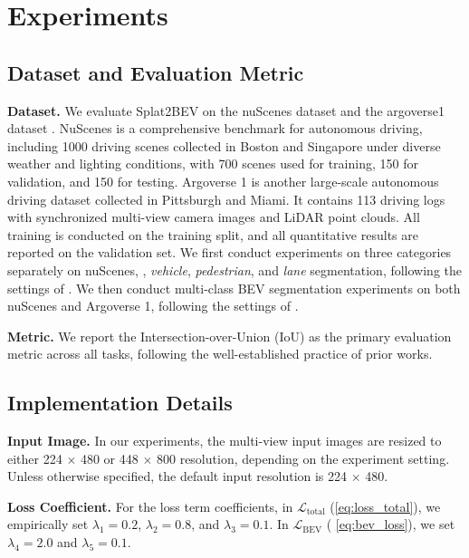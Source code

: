 \section{Experiments}
\label{sec:exp}
\subsection{Dataset and Evaluation Metric}
\noindent\textbf{Dataset.}
We evaluate Splat2BEV on the nuScenes dataset \cite{caesar2020nuscenes} and the argoverse1 dataset \cite{chang2019argoverse}.
NuScenes is a comprehensive benchmark for autonomous driving, including 1000 driving scenes collected in Boston and Singapore under diverse weather and lighting conditions, with 700 scenes used for training, 150 for validation, and 150 for testing. 
Argoverse 1 is another large-scale autonomous driving dataset collected in Pittsburgh and Miami. 
It contains 113 driving logs with synchronized multi-view camera images and LiDAR point clouds.
All training is conducted on the training split, and all quantitative results are reported on the validation set.
We first conduct experiments on three categories separately on nuScenes, \ie, \textit{vehicle}, \textit{pedestrian}, and \textit{lane} segmentation, following the settings of \cite{chambon2024pointbev, lu2025toward}.
We then conduct multi-class BEV segmentation experiments on both nuScenes and Argoverse 1, following the settings of \cite{zou2024diffbev, zhao2024improving}.



\noindent\textbf{Metric.}
We report the Intersection-over-Union (IoU) as the primary evaluation metric across all tasks, following the well-established practice of prior works. 

\subsection{Implementation Details}
\noindent\textbf{Input Image.}
In our experiments, the multi-view input images are resized to either 224 $\times$ 480 or 448 $\times$ 800 resolution, depending on the experiment setting.
Unless otherwise specified, the default input resolution is 224 $\times$ 480.

\noindent\textbf{Loss Coefficient.}
For the loss term coefficients, in $\mathcal{L}_{\text{total}}$ (\cref{eq:loss_total}), we empirically set $\lambda_1 = 0.2$, $\lambda_2 = 0.8$, and $\lambda_3 = 0.1$. 
In $\mathcal{L}_{\text{BEV}}$ ( \cref{eq:bev_loss}), we set $\lambda_4 = 2.0$ and $\lambda_5 = 0.1$.

